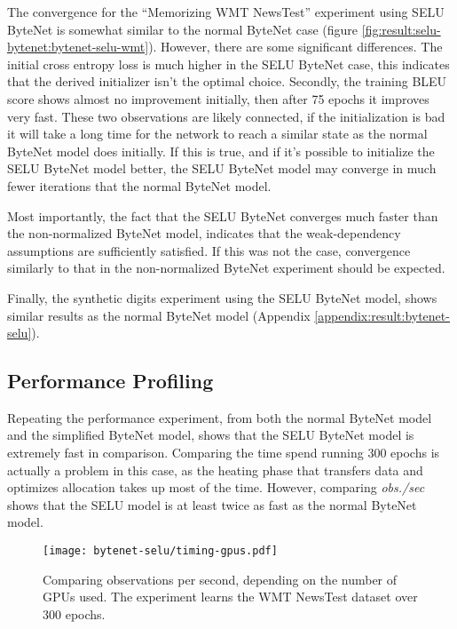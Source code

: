 The convergence for the ``Memorizing WMT NewsTest'' experiment using SELU ByteNet is somewhat similar to the normal ByteNet case (figure \ref{fig:result:selu-bytenet:bytenet-selu-wmt}). However, there are some significant differences. The initial cross entropy loss is much higher in the SELU ByteNet case, this indicates that the derived initializer isn't the optimal choice. Secondly, the training BLEU score shows almost no improvement initially, then after 75 epochs it improves very fast. These two observations are likely connected, if the initialization is bad it will take a long time for the network to reach a similar state as the normal ByteNet model does initially. If this is true, and if it's possible to initialize the SELU ByteNet model better, the SELU ByteNet model may converge in much fewer iterations that the normal ByteNet model.

Most importantly, the fact that the SELU ByteNet converges much faster than the non-normalized ByteNet model, indicates that the weak-dependency assumptions are sufficiently satisfied. If this was not the case, convergence similarly to that in the non-normalized ByteNet experiment should be expected.

Finally, the synthetic digits experiment using the SELU ByteNet model, shows similar results as the normal ByteNet model (Appendix \ref{appendix:result:bytenet-selu}).

\clearpage
\subsection{Performance Profiling}

Repeating the performance experiment, from both the normal ByteNet model and the simplified ByteNet model, shows that the SELU ByteNet model is extremely fast in comparison. Comparing the time spend running 300 epochs is actually a problem in this case, as the heating phase that transfers data and optimizes allocation takes up most of the time. However, comparing \textit{obs./sec} shows that the SELU model is at least twice as fast as the normal ByteNet model.

\begin{figure}[h]
    \centering
    \texttt{[image: bytenet-selu/timing-gpus.pdf]}
    \caption{Comparing observations per second, depending on the number of GPUs used. The experiment learns the WMT NewsTest dataset over 300 epochs.}
    \label{fig:result:selu-bytenet:timing-gpus}
\end{figure}

